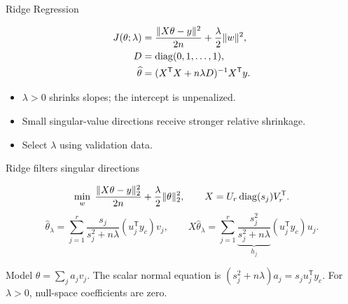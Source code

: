 \begin{frame}{Ridge Regression}
\begin{definitionbox}
\[
\begin{aligned}
J(\theta;\lambda)&=\frac{\lVert X\theta-y\rVert^2}{2n}+\frac{\lambda}{2}\lVert w\rVert^2,\\
D&=\operatorname{diag}(0,1,\ldots,1),\\
\widehat\theta&=(X^{\mathsf T}X+n\lambda D)^{-1}X^{\mathsf T}y.
\end{aligned}
\]
\end{definitionbox}
\small
\begin{itemize}\setlength{\itemsep}{7pt}
\item $\lambda>0$ shrinks slopes; the intercept is unpenalized.
\item Small singular-value directions receive stronger relative shrinkage.
\item Select $\lambda$ using validation data.
\end{itemize}
\end{frame}

\begin{frame}{Ridge filters singular directions}
\begin{definitionbox}
\[
 \min_w\;\frac{\|X\theta-y\|_2^2}{2n}+\frac{\lambda}{2}\|\theta\|_2^2,
 \qquad X=U_r\operatorname{diag}(s_j)V_r^{\mathsf T}.
\]
\[
 \widehat \theta_\lambda
 =\sum_{j=1}^r\frac{s_j}{s_j^2+n\lambda}(u_j^{\mathsf T}y_c)v_j,
 \qquad
X\widehat \theta_\lambda
 =\sum_{j=1}^r\underbrace{\frac{s_j^2}{s_j^2+n\lambda}}_{h_j}
 (u_j^{\mathsf T}y_c)u_j.
\]
\end{definitionbox}
\small
Model $\theta = \sum_{j} a_j v_j$.
The scalar normal equation is $(s_j^2+n\lambda)a_j=s_j u_j^{\mathsf T}y_c$.
For $\lambda>0$, null-space coefficients are zero.
\end{frame}


